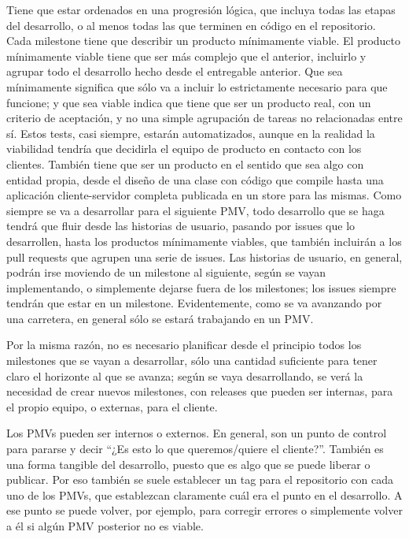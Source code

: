 Tiene que estar ordenados en una progresión lógica, que incluya 
todas las etapas del desarrollo, o al menos todas las que terminen 
en código en el repositorio.
Cada milestone tiene que describir un producto mínimamente viable. 
El producto mínimamente viable tiene que ser más complejo que 
el anterior, incluirlo y agrupar todo el desarrollo hecho desde 
el entregable anterior.
Que sea mínimamente significa que sólo va a incluir lo 
estrictamente necesario para que funcione; y que sea viable 
indica que tiene que ser un producto real, con un criterio 
de aceptación, y no una simple agrupación de tareas no 
relacionadas entre sí. Estos tests, casi siempre, estarán 
automatizados, aunque en la realidad la viabilidad tendría 
que decidirla el equipo de producto en contacto con los clientes.
También tiene que ser un producto en el sentido que sea algo 
con entidad propia, desde el diseño de una clase con código 
que compile hasta una aplicación cliente-servidor completa 
publicada en un store para las mismas.
Como siempre se va a desarrollar para el siguiente PMV, 
todo desarrollo que se haga tendrá que fluir desde las 
historias de usuario, pasando por issues que lo desarrollen, 
hasta los productos mínimamente viables, que también incluirán 
a los pull requests que agrupen una serie de issues. Las 
historias de usuario, en general, podrán irse moviendo de 
un milestone al siguiente, según se vayan implementando, 
o simplemente dejarse fuera de los milestones; los issues 
siempre tendrán que estar en un milestone. Evidentemente, 
como se va avanzando por una carretera, en general sólo 
se estará trabajando en un PMV.

Por la misma razón, no es necesario planificar desde el 
principio todos los milestones que se vayan a desarrollar, 
sólo una cantidad suficiente para tener claro el horizonte 
al que se avanza; según se vaya desarrollando, se verá la 
necesidad de crear nuevos milestones, con releases que 
pueden ser internas, para el propio equipo, o externas, para el cliente.

Los PMVs pueden ser internos o externos. En general, 
son un punto de control para pararse y decir 
“¿Es esto lo que queremos/quiere el cliente?”. 
También es una forma tangible del desarrollo, puesto 
que es algo que se puede liberar o publicar. 
Por eso también se suele establecer un tag para 
el repositorio con cada uno de los PMVs, que 
establezcan claramente cuál era el punto en el 
desarrollo. A ese punto se puede volver, por ejemplo, 
para corregir errores o simplemente volver a él si algún 
PMV posterior no es viable.

